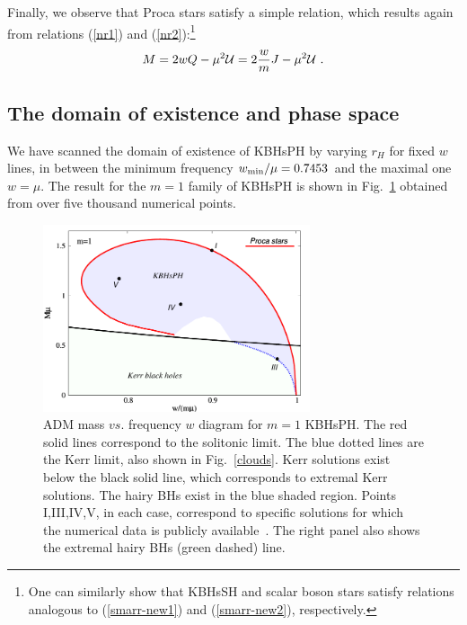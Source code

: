 Finally, we observe that Proca stars
satisfy a simple relation, which results again from relations (\ref{nr1}) and (\ref{nr2}):\footnote{One can similarly show that KBHsSH and scalar boson stars satisfy relations analogous to
(\ref{smarr-new1}) and  (\ref{smarr-new2}), respectively.} 
\begin{eqnarray}
\label{smarr-new2} 
M=2 w Q-\mu^2 {\cal U}=2\frac{w}{m} J-\mu^2 {\cal U}\ .
\end{eqnarray}

\subsection{The domain of existence and phase space}
\label{subsec_III}
We have scanned the domain of existence of KBHsPH by varying $r_H$ for fixed $w$ lines, 
in between the minimum frequency 
$w_{\rm min}/\mu=0.7453$ and the maximal one $w=\mu$. 
The result for the $m=1$ family of KBHsPH is shown in Fig.~\ref{figdomain} obtained from over five thousand numerical points. 


%
\begin{figure}[h!]
  \begin{center}
    \includegraphics[width=0.7\textwidth]{papers/Proca/BH-w-M-with-points.pdf}
  \end{center}
  \caption{ADM mass $vs.$ frequency $w$ diagram for $m=1$ KBHsPH. The red solid lines correspond to the solitonic limit. The blue dotted lines are the Kerr limit, also shown in Fig.~\ref{clouds}. Kerr solutions exist below the black solid line, which corresponds to extremal Kerr solutions. The hairy BHs exist in the blue shaded region. Points I,III,IV,V, in each case, correspond to specific solutions for which the numerical data is publicly available~\cite{datakbhph,datakbhsh}. The right panel also shows the extremal hairy BHs (green dashed) line.}
  \label{figdomain}
\end{figure}
%


